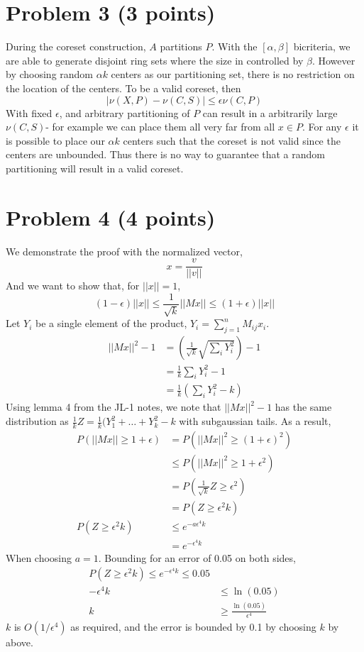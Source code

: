 \documentclass[letterpaper, 11pt]{article}
\begin{document}
\section*{Problem 3 (3 points)}
During the coreset construction, $A$ partitions $P$. With the $[\alpha,\beta]$ bicriteria, we are able to generate disjoint ring sets where the size in controlled by $\beta$. However by choosing random $\alpha k$ centers as our partitioning set, there is no restriction on the location of the centers. To be  a valid coreset, then
$$|\nu(X,P) - \nu(C,S)| \leq \epsilon\nu(C,P)$$
With fixed $\epsilon$, and arbitrary partitioning of $P$ can result in a arbitrarily large $\nu(C,S)$- for example we can place them all very far from all $x \in P$. For any $\epsilon$ it is possible to place our $\alpha k$ centers such that the coreset is not valid since the centers are unbounded. Thus there is no way to guarantee that a random partitioning will result in a valid coreset.


\pagebreak
\section*{Problem 4 (4 points)}
We demonstrate the proof with the normalized vector,
$$x = \frac{v}{||v||}$$
And we want to show that, for $||x|| = 1$,
$$(1-\epsilon)||x|| \leq \frac{1}{\sqrt k}||Mx|| \leq (1+\epsilon)||x||$$
Let $Y_i$ be a single element of the product, $Y_i=\sum_{j=1}^{n}M_{ij}x_i$.
\begin{align*}
	||Mx||^2 - 1 &= \left(\frac{1}{\sqrt k}\sqrt{\sum_iY_i^2}\right) - 1 \\
	&= \frac{1}{k}\sum_iY_i^2-1 \\
	&= \frac{1}{k}\left(\sum_iY_i^2-k\right)
\end{align*}
Using lemma 4 from the JL-1 notes, we note that $||Mx||^2 - 1$ has the same distribution as $\frac{1}{k}Z = \frac{1}{k}(Y_1^2+\dots+Y_k^2-k$ with subgaussian tails. As a result,
\begin{align*}
	P(||Mx|| \geq 1 + \epsilon) &= P\left(||Mx||^2 \geq (1+\epsilon)^2\right) \\
	&\leq P(||Mx||^2 \geq 1 + \epsilon^2 ) \\
	&= P\left(\frac{1}{\sqrt k}Z \geq \epsilon^2 \right) \\
	&= P(Z \geq \epsilon^2k) \\
	P(Z \geq \epsilon^2k) &\leq e^{-a\epsilon^4k} \\
	&= e^{-\epsilon^4k}
\end{align*}
When choosing $a=1$. Bounding for an error of 0.05 on both sides,
\begin{align*}
P(Z\geq\epsilon^2k) \leq e^{-\epsilon^4k} \leq 0.05 \\
-\epsilon^4k &\leq \ln(0.05) \\
k &\geq \frac{\ln(0.05)}{\epsilon^4}
\end{align*}
$k$ is $O(1/\epsilon^4)$ as required, and the error is bounded by 0.1 by choosing $k$ by above.
\end{document}
